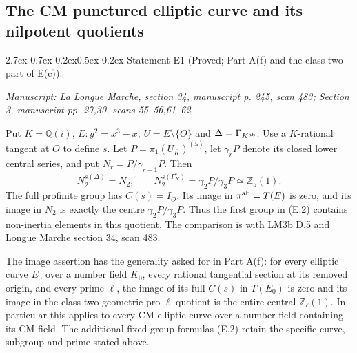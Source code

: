 \documentclass[11pt,a4paper]{article}
\makeatletter
\newcommand{\passage}[1]{\par\smallskip\noindent\textit{Manuscript: #1}\par\smallskip}
\renewcommand\paragraph{\@startsection{paragraph}{4}{\z@}%
  {2.7ex \@plus 0.7ex \@minus 0.2ex}{0.5ex \@plus 0.2ex}%
  {\normalfont\normalsize\bfseries}}
\makeatother
\begin{document}


\subsection{The CM punctured elliptic curve and its nilpotent quotients}
\paragraph{Statement E1 (Proved; Part A(f) and the class-two part of E(c)).}\label{res:E1}
\passage{La Longue Marche, section 34, manuscript p. 245, scan 483; Section 3, manuscript pp. 27,30, scans 55–56,61–62}

Put $K=\mathbb Q(i)$, $E:y^2=x^3-x$, $U=E\setminus\{O\}$ and $\Delta=\Gamma_{K^{\rm ab}}$. Use a $K$-rational tangent at $O$ to define $s$. Let $P=\pi_1(U_{\overline K})^{(5)}$, let $\gamma_rP$ denote its closed lower central series, and put $N_r=P/\gamma_{r+1}P$. Then
\[
 N_2^{s(\Delta)}=N_2,\qquad
 N_2^{s(\Gamma_K^\circ)}=\gamma_2P/\gamma_3P\simeq\mathbb Z_5(1).
 \tag{E.2}
\]
The full profinite group has $C(s)=I_O$. Its image in $\pi^{\rm ab}=T(E)$ is zero, and its image in $N_2$ is exactly the centre $\gamma_2P/\gamma_3P$. Thus the first group in (E.2) contains non-inertia elements in this quotient. The comparison is with LM3b D.5 and Longue Marche section 34, scan 483.

The image assertion has the generality asked for in Part A(f): for every
elliptic curve $E_0$ over a number field $K_0$, every rational tangential
section at its removed origin, and every prime $\ell$, the image of its
full $C(s)$ in $T(E_0)$ is zero and its image in the class-two geometric
pro-$\ell$ quotient is the entire central $\mathbb Z_\ell(1)$.
In particular this applies to every CM elliptic curve over a number field
containing its CM field. The additional fixed-group formulas (E.2) retain
the specific curve, subgroup and prime stated above.
\end{document}
